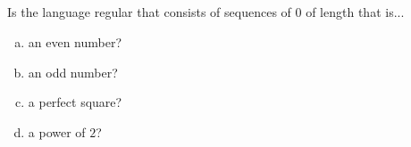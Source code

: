 \subsection{}

Is the language regular that consists of sequences of $0$ of length that is...
\begin{enumerate}[a.)]
\item an even number?
\item  an odd number?
\item a perfect square?
\item  a power of $2$?
\end{enumerate}